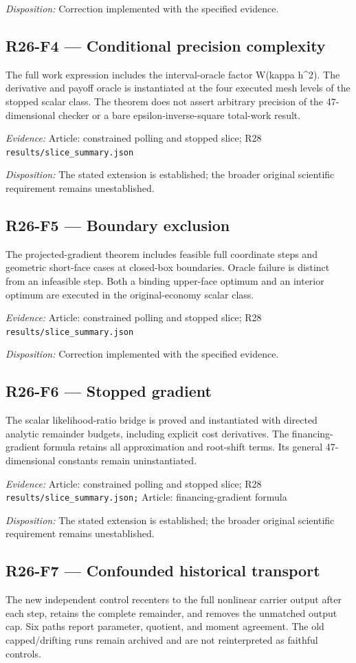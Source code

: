 \emph{Disposition:} Correction implemented with the specified evidence.
\subsection{R26-F4 --- Conditional precision complexity}
The full work expression includes the interval-oracle factor W(kappa h\textasciicircum{}2). The derivative and payoff oracle is instantiated at the four executed mesh levels of the stopped scalar class. The theorem does not assert arbitrary precision of the 47-dimensional checker or a bare epsilon-inverse-square total-work result.

\emph{Evidence:} Article: constrained polling and stopped slice; R28 \nolinkurl{results/slice_summary.json}

\emph{Disposition:} The stated extension is established; the broader original scientific requirement remains unestablished.
\subsection{R26-F5 --- Boundary exclusion}
The projected-gradient theorem includes feasible full coordinate steps and geometric short-face cases at closed-box boundaries. Oracle failure is distinct from an infeasible step. Both a binding upper-face optimum and an interior optimum are executed in the original-economy scalar class.

\emph{Evidence:} Article: constrained polling and stopped slice; R28 \nolinkurl{results/slice_summary.json}

\emph{Disposition:} Correction implemented with the specified evidence.
\subsection{R26-F6 --- Stopped gradient}
The scalar likelihood-ratio bridge is proved and instantiated with directed analytic remainder budgets, including explicit cost derivatives. The financing-gradient formula retains all approximation and root-shift terms. Its general 47-dimensional constants remain uninstantiated.

\emph{Evidence:} Article: constrained polling and stopped slice; R28 \nolinkurl{results/slice_summary.json;} Article: financing-gradient formula

\emph{Disposition:} The stated extension is established; the broader original scientific requirement remains unestablished.
\subsection{R26-F7 --- Confounded historical transport}
The new independent control recenters to the full nonlinear carrier output after each step, retains the complete remainder, and removes the unmatched output cap. Six paths report parameter, quotient, and moment agreement. The old capped/drifting runs remain archived and are not reinterpreted as faithful controls.

